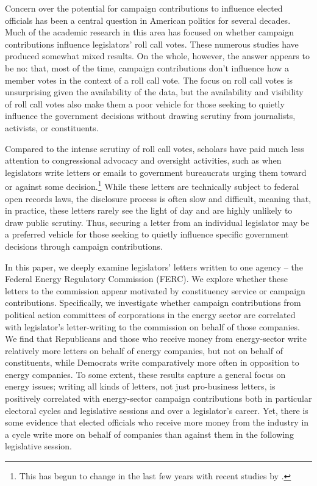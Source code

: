 \documentclass{article}
\begin{document}
Concern over the potential for campaign contributions to influence elected officials has been a central question in American politics for several decades.  Much of the academic research in this area has focused on whether campaign contributions influence legislators' roll call votes.  These numerous studies have produced somewhat mixed results. On the whole, however, the answer appears to be no: that, most of the time, campaign contributions don't influence how a member votes in the context of a roll call vote.  The focus on roll call votes is unsurprising given the availability of the data, but the availability and visibility of roll call votes also make them a poor vehicle for those seeking to quietly influence the government decisions without drawing scrutiny from journalists, activists, or constituents. 

Compared to the intense scrutiny of roll call votes, scholars have paid much less attention to congressional advocacy and oversight activities, such as when legislators write letters or emails to government bureaucrats urging them toward or against some decision.\footnote{This has begun to change in the last few years with recent studies by  \citet{MillsKalafHuges2015, Ritchie2017, Lowande2018JOP, LowandeRitchieLauterbach2018, JudgeLordGrimmerPowell2018}.} While these letters are technically subject to federal open records laws, the disclosure process is often slow and difficult, meaning that, in practice, these letters rarely see the light of day and are highly unlikely to draw public scrutiny. Thus, securing a letter from an individual legislator may be a preferred vehicle for those seeking to quietly influence specific government decisions through campaign contributions.  

In this paper, we deeply examine legislators' letters written to one agency -- the Federal Energy Regulatory Commission (FERC).  We explore whether these letters to the commission appear motivated by constituency service or campaign contributions. Specifically, we investigate whether campaign contributions from political action committees of corporations in the energy sector are correlated with legislator's letter-writing to the commission on behalf of those companies. We find that Republicans and those who receive money from energy-sector write relatively more letters on behalf of energy companies, but not on behalf of constituents, while Democrats write comparatively more often in opposition to energy companies. To some extent, these results capture a general focus on energy issues; writing all kinds of letters, not just pro-business letters, is positively correlated with energy-sector campaign contributions both in particular electoral cycles and legislative sessions and over a legislator's career. Yet, there is some evidence that elected officials who receive more money from the industry in a cycle write more on behalf of companies than against them in the following legislative session. %
\end{document}
